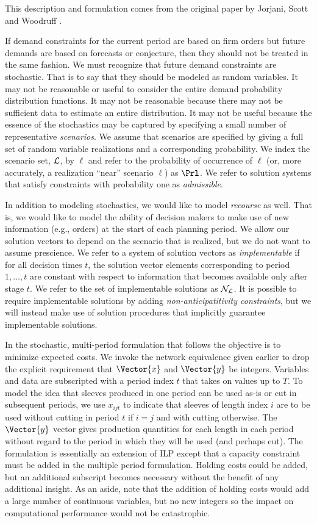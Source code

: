 This description and formulation comes from the original paper by Jorjani, Scott
and Woodruff \cite{sizes}.

If demand constraints for the current period are based on firm orders but future
demands are based on forecasts or conjecture, then they should not be treated in
the same fashion. We must recognize that future demand constraints are
stochastic. That is to say that they should be modeled as random variables. It
may not be reasonable or useful to consider the entire demand probability
distribution functions. It may not be reasonable because there may not be
sufficient data to estimate an entire distribution. It may not be useful because
the essence of the stochastics may be captured by specifying a small number of
representative {\em scenarios}. We assume that scenarios are specified by giving
a full set of random variable realizations and a corresponding probability. We
index the scenario set, ${\cal L}$, by $\ell$ and refer to the probability of
occurrence of $\ell$ (or, more accurately, a realization ``near'' scenario
$\ell$) as $\Prl$. We refer to solution systems that satisfy constraints with
probability one as {\em admissible}.

In addition to modeling stochastics, we would like to model {\em recourse} as
well. That is, we would like to model the ability of decision makers to make use
of new information (e.g., orders) at the start of each planning period. We allow
our solution vectors to depend on the scenario that is realized, but we do not
want to assume prescience. We refer to a system of solution vectors as {\em
implementable} if for all decision times $t$, the solution vector elements
corresponding to period $1,\ldots,t$ are constant with respect to information
that becomes available only after stage $t$. We refer to the set of
implementable solutions as ${\cal N}_{\cal L}$. It is possible to require
implementable solutions by adding {\em non-anticipatitivity constraints}, but we
will instead make use of solution procedures that implicitly guarantee
implementable solutions.

In the stochastic, multi-period formulation that follows the objective is to
minimize expected costs. We invoke the network equivalence given earlier to drop
the explicit requirement that $\Vector{x}$ and $\Vector{y}$ be integers.
Variables and data are subscripted with a period index $t$ that takes on values
up to $T$. To model the idea that sleeves produced in one period can be used
as-is or cut in subsequent periods, we use $x_{ijt}$ to indicate that sleeves of
length index $i$ are to be used without cutting in period $t$ if $i=j$ and with
cutting otherwise. The $\Vector{y}$ vector gives production quantities for each
length in each period without regard to the period in which they will be used
(and perhaps cut). The formulation is essentially an extension of ILP except
that a capacity constraint must be added in the multiple period formulation.
Holding costs could be added, but an additional subscript becomes necessary
without the benefit of any additional insight. As an aside, note that the
addition of holding costs would add a large number of continuous variables, but
no new integers so the impact on computational performance would not be
catastrophic.


